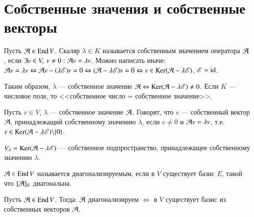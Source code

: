 \documentclass[main]{subfiles}
\begin{document}
\chapter{Собственные значения и собственные векторы}

Пусть $\mathcal{A} \in \operatorname{End} V$. Скаляр $\lambda \in K$ называется собственным значением оператора
$\mathcal{A}$, если $\exists v \in V,\ v \neq 0 : \mathcal{A} v = \lambda v$.
Можно написать иначе: $\mathcal{A} v = \lambda v \Leftrightarrow \mathcal{A} v - (\lambda \mathscr{E}) v = 0
    \Leftrightarrow (\mathcal{A} -\lambda\mathscr{E})v = 0
    \Leftrightarrow v \in \operatorname{Ker}(\mathcal{A} -\lambda\mathscr{E})$, $\mathscr{E} = \mathrm{id}$.

\begin{definition} 
    Таким образом, $\lambda$  —  собственное значение $\mathcal{A}
        \Leftrightarrow  \operatorname{Ker}(\mathcal{A} -\lambda\mathscr{E}) \neq 0$.
    Если $K$ — числовое поле, то <<собственное число = собственное значение>>.
\end{definition}

\begin{definition} 
    Пусть $v \in V$, $\lambda$ — собственное значение $\mathcal{A}$.
    Говорят, что $v$ — собственный вектор $\mathcal{A}$, принадлежащий собственному значению
    $\lambda$, если $v \neq 0$ и $\mathcal{A} v = \lambda v$,
    т.е. $v \in \operatorname{Ker} (\mathcal{A} - \lambda \mathscr{E}) \backslash  \{0\}$.
\end{definition}

\begin{definition} 
    $V_\lambda = \operatorname{Ker}(\mathcal{A} - \lambda \mathscr{E})$ —
    собственное подпространство, принадлежащее собственному значению $\lambda$.
\end{definition}

\begin{definition} 
    $\mathcal{A}  \in \operatorname{End} V$ называется диагонализируемым, если в $V$ существует
    базис $E$, такой что $[\mathcal{A}]_E$ диагональна.
\end{definition}

\begin{proposition}
    Пусть $\mathcal{A} \in \operatorname{End} V$. Тогда: $\mathcal{A}$ диагонализируем
    $\Leftrightarrow$ в $V$ существует базис из собственных векторов $\mathcal{A}$.
\end{proposition}
\end{document}
